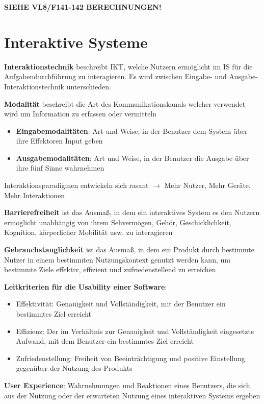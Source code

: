 \textbf{SIEHE VL8/F141-142 BERECHNUNGEN!}

\section{Interaktive Systeme}

\textbf{Interaktionstechnik} beschreibt IKT, welche Nutzern ermöglicht im IS für die Aufgabendurchführung zu interagieren. Es wird zwischen Eingabe- und Ausgabe-Interaktionstechnik unterschieden.

\textbf{Modalität} beschreibt die Art des Kommunikationskanals welcher verwendet wird um Information zu erfassen oder vermitteln
\begin{itemize}
	\item \textbf{Eingabemodalitäten}: Art und Weise, in der Benutzer dem System über ihre Effektoren Input geben
	\item \textbf{Ausgabemodalitäten}: Art und Weise, in der Benutzer die Ausgabe über ihre fünf Sinne wahrnehmen
\end{itemize}

Interaktionsparadigmen entwickeln sich rasant $\rightarrow$ Mehr Nutzer, Mehr Geräte, Mehr Interaktionen

\textbf{Barrierefreiheit} ist das Ausmaß, in dem ein interaktives System es den
Nutzern ermöglicht unabhängig von ihrem Sehvermögen, Gehör, Geschicklichkeit, Kognition, körperlicher Mobilität usw. zu interagieren

\textbf{Gebrauchstauglichkeit} ist das Ausmaß, in dem ein Produkt durch bestimmte Nutzer in einem bestimmten Nutzungskontext genutzt werden kann, um bestimmte Ziele effektiv, effizient und zufriedenstellend zu erreichen

\textbf{Leitkriterien für die Usability einer Software}:
\begin{itemize}
	\item Effektivität: Genauigkeit und Vollständigkeit, mit der Benutzer ein bestimmtes Ziel erreicht
	\item Effizienz: Der im Verhältnis zur Genauigkeit und Vollständigkeit eingesetzte Aufwand, mit dem Benutzer ein bestimmtes Ziel erreicht
	\item Zufriedenstellung: Freiheit von Beeinträchtigung und positive Einstellung gegenüber der Nutzung des Produkts
\end{itemize}

\textbf{User Experience}: Wahrnehmungen und Reaktionen eines Benutzers, die sich aus der Nutzung oder der erwarteten Nutzung eines interaktiven Systems ergeben

